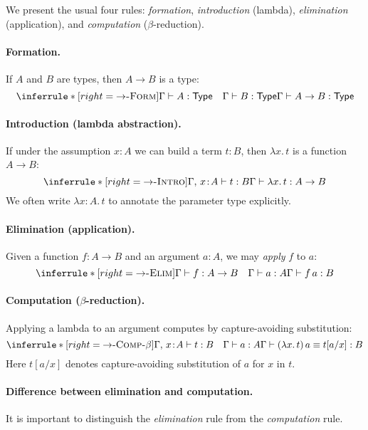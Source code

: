 \documentclass{article}
\newcommand{\Type}{\ensuremath{\mathsf{Type}}}
\newcommand{\judg}[3]{#1 \vdash #2 : #3}   %
\newcommand{\jdeq}{\equiv}                 %
\newcommand{\teq}[4]{#1 \vdash #2 \jdeq #3 : #4} %
\newcommand{\rulename}[1]{\textsc{#1}}
\begin{document}
We present the usual four rules: \emph{formation}, \emph{introduction} (lambda),
\emph{elimination} (application), and \emph{computation} (\(\beta\)-reduction).

\paragraph{Formation.}
If \(A\) and \(B\) are types, then \(A \to B\) is a type:
\[
\inferrule*[right=\rulename{\(\to\)-Form}]{
  \judg{\Gamma}{A}{\Type}
  \quad
  \judg{\Gamma}{B}{\Type}
}{
  \judg{\Gamma}{A \to B}{\Type}
}
\]

\paragraph{Introduction (lambda abstraction).}
If under the assumption \(x:A\) we can build a term \(t:B\), then
\(\lambda x.\,t\) is a function \(A \to B\):
\[
\inferrule*[right=\rulename{\(\to\)-Intro}]{
  \judg{\Gamma,\,x\!:\!A}{t}{B}
}{
  \judg{\Gamma}{\lambda x.\,t}{A \to B}
}
\]
We often write \(\lambda x:A.\,t\) to annotate the parameter type explicitly.

\paragraph{Elimination (application).}
Given a function \(f:A\to B\) and an argument \(a:A\), we may \emph{apply} \(f\) to \(a\):
\[
\inferrule*[right=\rulename{\(\to\)-Elim}]{
  \judg{\Gamma}{f}{A \to B}
  \quad
  \judg{\Gamma}{a}{A}
}{
  \judg{\Gamma}{f\,a}{B}
}
\]

\paragraph{Computation (\(\beta\)-reduction).}
Applying a lambda to an argument computes by capture-avoiding substitution:
\[
\inferrule*[right=\rulename{\(\to\)-Comp-\(\beta\)}]{
  \judg{\Gamma,\,x\!:\!A}{t}{B}
  \quad
  \judg{\Gamma}{a}{A}
}{
  \teq{\Gamma}{(\lambda x.\,t)\,a}{t[a/x]}{B}
}
\]
Here \(t[a/x]\) denotes capture-avoiding substitution of \(a\) for \(x\) in \(t\).

\paragraph{Difference between elimination and computation.}
It is important to distinguish the \emph{elimination} rule from the \emph{computation} rule.
\end{document}
